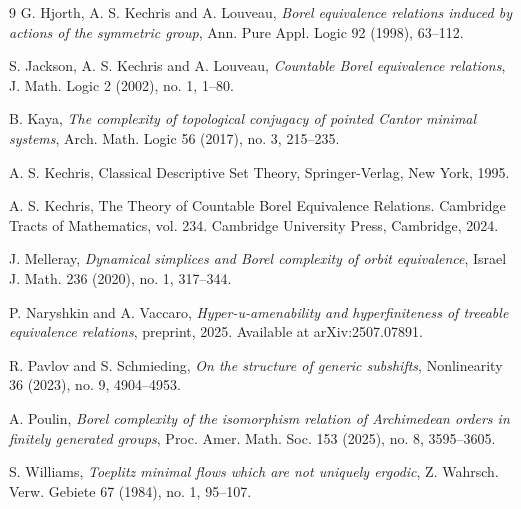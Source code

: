\documentclass{amsart}
\theoremstyle{definition}
\theoremstyle{problem}
\theoremstyle{remark}
\numberwithin{equation}{section}
\begin{document}
\begin{thebibliography}{9}
 G. Hjorth, A. S. Kechris and A. Louveau, \textit{Borel equivalence relations
 induced by actions of the symmetric group}, Ann. Pure Appl. Logic 92 (1998), 63--112.

S. Jackson, A. S. Kechris and A. Louveau, \textit{Countable Borel equivalence
 relations}, J. Math. Logic 2 (2002), no. 1, 1--80.

 B. Kaya, \textit{The complexity of topological conjugacy of pointed Cantor minimal systems}, Arch. Math. Logic 56 (2017), no. 3, 215--235.

A. S. Kechris, Classical Descriptive Set Theory, Springer-Verlag, New York, 1995.

A. S. Kechris, The Theory of Countable Borel Equivalence Relations. Cambridge Tracts of Mathematics, vol. 234. Cambridge University Press, Cambridge, 2024.

J. Melleray, \textit{Dynamical simplices and Borel complexity of orbit equivalence}, {Israel J. Math.} 236 (2020), no. 1, 317--344.

P. Naryshkin and A. Vaccaro,
\textit{Hyper-u-amenability and hyperfiniteness of treeable equivalence relations}, preprint, 2025. Available at arXiv:2507.07891.

 R. Pavlov and S. Schmieding,
\textit{On the structure of generic subshifts}, Nonlinearity 36 (2023), no. 9, 4904--4953.

A. Poulin,
\textit{Borel complexity of the isomorphism relation of Archimedean orders in finitely generated groups}, 
Proc. Amer. Math. Soc. 153 (2025), no. 8, 3595--3605.

S. Williams, \textit{Toeplitz minimal flows which are not uniquely ergodic}, Z. Wahrsch. Verw. Gebiete 67 (1984), no. 1, 95--107.







    \end{thebibliography}
\end{document}
